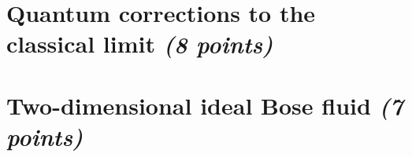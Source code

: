\documentclass[11 pt]{article}
\begin{document}
    \section{
        Quantum corrections to the classical limit \textit{(8 points)}
    }
    
    \newpage

    \section{Two-dimensional ideal Bose fluid \textit{(7 points)}
    }
    
    \newpage
\end{document}

